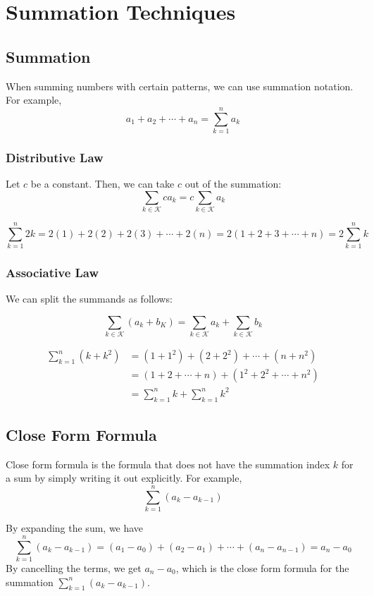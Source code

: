 \chapter{Summation Techniques}

\section{Summation}
When summing numbers with certain patterns, we can use summation notation. For example,
\[
	a_1 + a_2 + \cdots + a_n = \sum_{k=1}^n a_k 
\]

\subsection{Distributive Law}
Let \(c\) be a constant. Then, we can take \(c\) out of the summation:
\[
	\sum_{k\in\mathcal{K} } ca_k = c\sum_{k\in\mathcal{K} }a_k 
\]

\begin{eg}
	\[
		\sum_{k=1}^n 2k = 2(1) + 2(2) + 2(3) + \cdots + 2(n) = 2(1 + 2 + 3 + \cdots + n) = 2\sum_{k=1}^n k  
	\]
\end{eg}

\subsection{Associative Law}
We can split the summands as follows:

\[
	\sum_{k\in\mathcal{K}}(a_k + b_K) = \sum_{k\in\mathcal{K}}a_k + \sum_{k\in\mathcal{K}}b_k
\]

\begin{eg}
	\[\begin{aligned}
		\sum_{k = 1}^n(k + k^2) &= (1 + 1^2) + (2 + 2^2) + \cdots + (n + n^2) \\
		&= (1 + 2 + \cdots + n) + (1^2 + 2^2 + \cdots + n^2) \\
		&= \sum_{k = 1}^n k + \sum_{k = 1}^n k^2
	\end{aligned}\]
\end{eg}

\section{Close Form Formula}
Close form formula is the formula that does not have the summation index \(k\) for a sum by simply writing it out explicitly. For example,
\[
	\sum_{k = 1}^n (a_{k} - a_{k-1})
\]

By expanding the sum, we have
\[
	\sum_{k = 1}^n (a_{k} - a_{k-1}) = (a_1 - a_0) + (a_2 - a_1) + \cdots + (a_n - a_{n-1}) = a_n - a_0
\]
By cancelling the terms, we get \(a_n - a_0\), which is the close form formula for the summation \(\sum_{k = 1}^n (a_{k} - a_{k-1})\).

